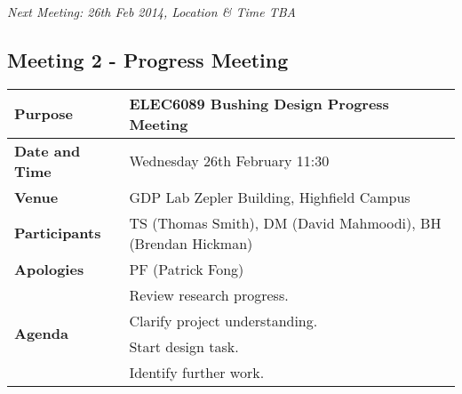 \emph{Next Meeting: 26th Feb 2014, Location \& Time TBA}


\subsection{Meeting 2 - Progress Meeting}
\begin{center}
\begin{longtable}{| m{} | m{} |} \hline
\textbf{Purpose} & ELEC6089 Bushing Design Progress Meeting \\ \hline
\textbf{Date and Time} & Wednesday 26th February 11:30 \\ \hline
\textbf{Venue} & GDP Lab Zepler Building, Highfield Campus \\ \hline
\textbf{Participants} & TS (Thomas Smith), DM (David Mahmoodi), BH (Brendan Hickman)\\ \hline
\textbf{Apologies} &PF (Patrick Fong) \\ \hline
\multirow{4}{*}{\textbf{Agenda}} & Review research progress. \\
 & Clarify project understanding. \\ 
 & Start design task. \\
 & Identify further work. \\ \hline
\end{longtable}
\end{center}

